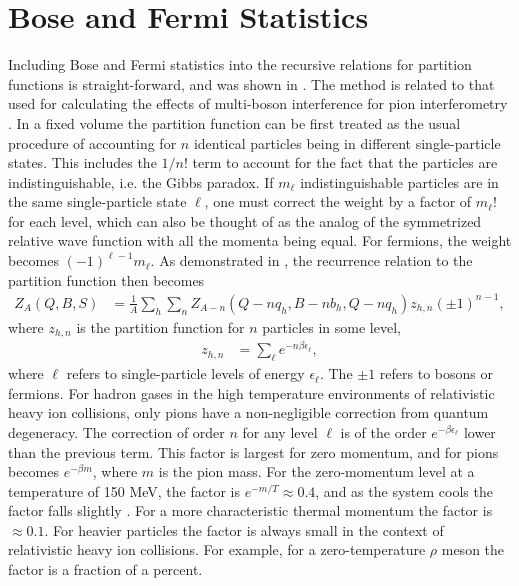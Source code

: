 
\section{Bose and Fermi Statistics}\label{sec:bose}

Including Bose and Fermi statistics into the recursive relations for partition functions is straight-forward, and was shown in \cite{Cheng:2002jb,Pratt:1999ns}. The method is related to that used for calculating the effects of multi-boson interference for pion interferometry \cite{Pratt:1993uy}. In a fixed volume the partition function can be first treated as the usual procedure of accounting for $n$ identical particles being in different single-particle states. This includes the $1/n!$ term to account for the fact that the particles are indistinguishable, i.e. the Gibbs paradox. If $m_\ell$ indistinguishable particles are in the same single-particle state $\ell$, one must correct the weight by a factor of $m_\ell!$ for each level, which can also be thought of as the analog of the symmetrized relative wave function with all the momenta being equal. For fermions, the weight becomes $(-1)^{\ell-1}m_\ell$. As demonstrated in \cite{Pratt:1999ns}, the recurrence relation to the partition function then becomes
\begin{eqnarray}\label{eq:Zbf}
Z_{A}(Q,B,S)&=\frac{1}{A}\sum_h \sum_n Z_{A-n}(Q-nq_h,B-nb_h,Q-nq_h)z_{h,n}(\pm 1)^{n-1},
\end{eqnarray}
where $z_{h,n}$ is the partition function for $n$ particles in some level, 
\begin{eqnarray}
z_{h,n}&=\sum_\ell e^{-n\beta \epsilon_\ell},
\end{eqnarray}
where $\ell$ refers to single-particle levels of energy $\epsilon_\ell$. The $\pm 1$ refers to bosons or fermions. For hadron gases in the high temperature environments of relativistic heavy ion collisions, only pions have a non-negligible correction from quantum degeneracy. The correction of order $n$ for any level $\ell$ is of the order $e^{-\beta \epsilon_\ell}$ lower than the previous term. This factor is largest for zero momentum, and for pions becomes $e^{-\beta m}$, where $m$ is the pion mass. For the zero-momentum level at a temperature of 150 MeV, the factor is $e^{-m/T}\approx 0.4$, and as the system cools the factor falls slightly \cite{Greiner:1993jn}. For a more characteristic thermal momentum the factor is $\approx 0.1$. For heavier particles the factor is always small in the context of relativistic heavy ion collisions. For example, for a zero-temperature $\rho$ meson the factor is a fraction of a percent.

